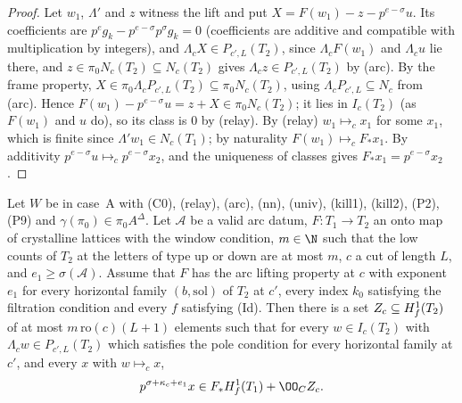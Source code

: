 \begin{proof}
Let $w_1$, $\Lambda'$ and $z$ witness the lift and put $X=F(w_1)-z-p^{e-\sigma}u$. Its coefficients are
$p^eg_k-p^{e-\sigma}p^\sigma g_k=0$ (coefficients are additive and compatible with multiplication by integers), and
$\Lambda_cX\in P_{c',L}(T_2)$, since $\Lambda_cF(w_1)$ and $\Lambda_cu$ lie there, and $z\in\pi_0N_c(T_2)\subseteq N_c(T_2)$
gives $\Lambda_cz\in P_{c',L}(T_2)$ by (arc). By the frame property, $X\in\pi_0\Lambda_cP_{c',L}(T_2)\subseteq\pi_0N_c(T_2)$, using
$\Lambda_cP_{c',L}\subseteq N_c$ from (arc). Hence $F(w_1)-p^{e-\sigma}u=z+X\in\pi_0N_c(T_2)$; it lies in $I_c(T_2)$
(as $F(w_1)$ and $u$ do), so its class is $0$ by (relay). By (relay) $w_1\mapsto_cx_1$ for some $x_1$, which is finite
since $\Lambda'w_1\in N_c(T_1)$; by naturality $F(w_1)\mapsto_cF_*x_1$. By additivity $p^{e-\sigma}u\mapsto_c p^{e-\sigma}x_2$,
and the uniqueness of classes gives $F_*x_1=p^{e-\sigma}x_2$.
\end{proof}

\begin{proposition}\label{pf:linkN-adm:arclen}
Let $W$ be in case~A with (C0), (relay), (arc), (nn), (univ), (kill1), (kill2), (P2), (P9) and $\gamma(\pi_0)\in\pi_0A^\Delta$.
Let $\mathcal A$ be a valid arc datum, $F\colon T_1\to T_2$ an onto map of crystalline lattices with the window condition,
$m\in\N$ such that the low counts of $T_2$ at the letters of type up or down are at most $m$, $c$ a cut of length $L$, and
$e_1\ge\sigma(\mathcal A)$. Assume that $F$ has the arc lifting property at $c$ with exponent $e_1$ for every horizontal
family $(b,\mathrm{sol})$ of $T_2$ at $c'$, every index $k_0$ satisfying the filtration condition and every $f$ satisfying
(Id). Then there is a set $Z_c\subseteq H^1_{f}(T_2)$ of at most $m\,\mathrm{ro}(c)(L+1)$ elements such that for every
$w\in I_c(T_2)$ with $\Lambda_cw\in P_{c',L}(T_2)$ which satisfies the pole condition for every horizontal family at $c'$,
and every $x$ with $w\mapsto_cx$,
\[
p^{\sigma+\kappa_c+e_1}x\in F_*\linkNadmHf(T_1)+\OO_CZ_c .
\]
\end{proposition}

